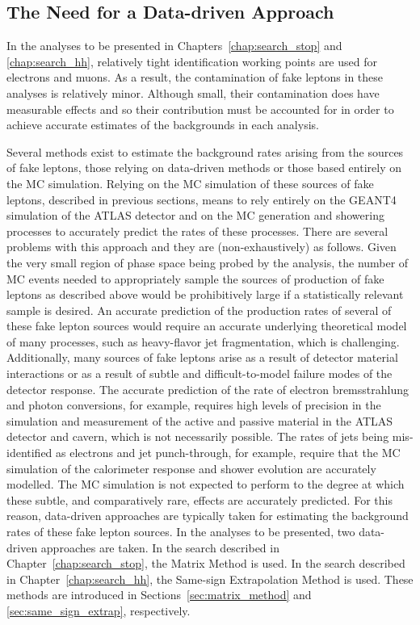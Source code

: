 \subsection{The Need for a Data-driven Approach}
\label{sec:fake_dd_motivation}

In the analyses to be presented in Chapters~\ref{chap:search_stop} and \ref{chap:search_hh},
relatively tight identification working points are used for electrons and muons.
As a result, the contamination of fake leptons in these analyses is relatively
minor.
Although small, their contamination does have measurable effects and so their contribution
must be accounted for in order to achieve accurate estimates of the backgrounds
in each analysis.

Several methods exist to estimate the background rates arising from the sources of fake
leptons, those relying on data-driven methods or those based entirely on the MC
simulation.
Relying on the MC simulation of these sources of fake leptons, described in previous
sections, means to rely entirely on the \textsc{GEANT4} simulation of the ATLAS detector
and on the MC generation and showering processes to accurately predict the
rates of these processes.
There are several problems with this approach and they are (non-exhaustively) as follows.
Given the very small region of phase space being probed by the analysis,
the number of MC events needed to appropriately sample the sources of production of fake
leptons as described above would be prohibitively large if a statistically relevant sample
is desired.
An accurate prediction of the production rates of several of these fake lepton sources
would require an accurate underlying theoretical model of many processes, such as
heavy-flavor jet fragmentation, which is challenging.
Additionally, many sources of fake leptons arise as a result of detector material interactions
or as a result of subtle and difficult-to-model failure modes of the detector response.
The accurate prediction of the rate of electron bremsstrahlung and photon conversions, for example, requires
high levels of precision in the simulation and measurement of the active and passive material in the ATLAS detector and cavern,
which is not necessarily possible.
The rates of jets being mis-identified as electrons and jet punch-through, for example,
require that the MC simulation of the calorimeter response and shower evolution are
accurately modelled.
The MC simulation is not expected to perform to the degree at which these subtle, and comparatively rare, effects
are accurately predicted.
For this reason, data-driven approaches are typically taken for estimating the background rates
of these fake lepton sources.
In the analyses to be presented, two data-driven approaches are taken.
In the search described in Chapter~\ref{chap:search_stop}, the Matrix Method
is used.
In the search described in Chapter~\ref{chap:search_hh}, the Same-sign Extrapolation
Method is used.
These methods are introduced in Sections~\ref{sec:matrix_method} and \ref{sec:same_sign_extrap}, respectively.



